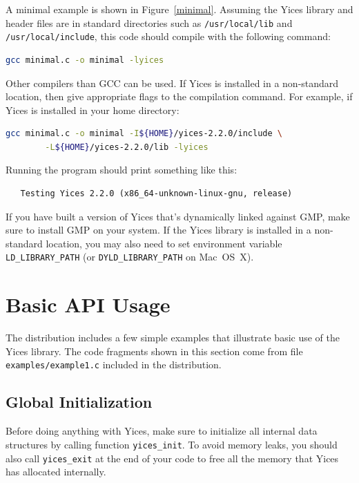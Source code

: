\documentclass[11pt,twoside,fleqn,openright,titlepage]{cslreport}
\begin{document}
\medskip\noindent A minimal example is shown in
Figure~\ref{minimal}. Assuming the Yices library and header files are
in standard directories such as \texttt{/usr/local/lib} and
\texttt{/usr/local/include}, this code should compile with the
following command:
\begin{small}
\begin{lstlisting}[language=sh]
   gcc minimal.c -o minimal -lyices
\end{lstlisting}
\end{small}
Other compilers than GCC can be used. If Yices is installed in a
non-standard location, then give appropriate flags to the compilation
command. For example, if Yices is installed in your home directory:
\begin{small}
\begin{lstlisting}[language=sh]
   gcc minimal.c -o minimal -I${HOME}/yices-2.2.0/include \
        -L${HOME}/yices-2.2.0/lib -lyices
\end{lstlisting}
\end{small}
Running the program should print something like this:
\begin{small}
\begin{verbatim}
   Testing Yices 2.2.0 (x86_64-unknown-linux-gnu, release)
\end{verbatim}
\end{small}
If you have built a version of Yices that's dynamically linked against
GMP, make sure to install GMP on your system.  If the Yices library is
installed in a non-standard location, you may also need to set
environment variable \texttt{LD\_LIBRARY\_PATH} (or
\texttt{DYLD\_LIBRARY\_PATH} on Mac~OS~X).


\section{Basic API Usage}

The distribution includes a few simple examples that illustrate basic
use of the Yices library. The code fragments shown in this section
come from file \texttt{examples/example1.c} included in the
distribution.

\subsection*{Global Initialization}

Before doing anything with Yices, make sure to initialize all internal
data structures by calling function \texttt{yices\_init}.  To avoid
memory leaks, you should also call \texttt{yices\_exit} at the end of
your code to free all the memory that Yices has allocated internally.
\end{document}
